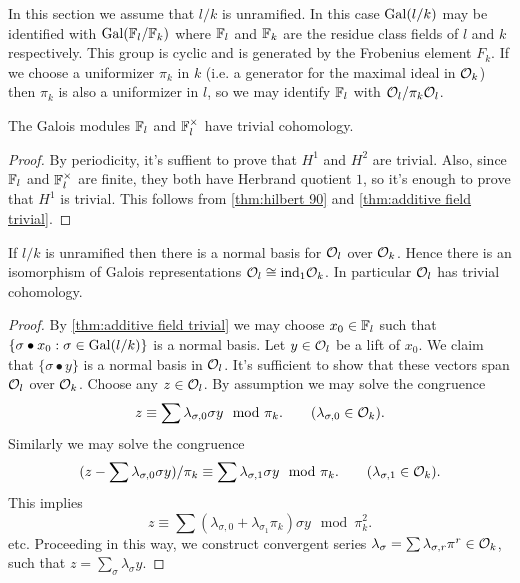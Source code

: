 In this section we assume that $l/k$ is unramified.
In this case $\mathrm{Gal}(l/k)$ may be identified with $\mathrm{Gal}({\mathbb F}_l / {\mathbb F}_k)$ where
${\mathbb F}_l$ and ${\mathbb F}_k$ are the residue class fields of $l$ and $k$ respectively.
This group is cyclic and is generated by the Frobenius element $F_k$.
If we choose a uniformizer $\pi_k$ in $k$ (i.e. a generator for the maximal ideal in ${\mathcal O}_k$)
then $\pi_k$ is also a uniformizer in $l$, so we may identify ${\mathbb F}_l$ with ${\mathcal O}_l / \pi_k {\mathcal O}_l$.

\begin{lemma} \label{lem:finite field trivial}
	The Galois modules ${\mathbb F}_l$ and ${\mathbb F}_l^\times$ have trivial cohomology.
\end{lemma}

\begin{proof}
	By periodicity, it's suffient to prove that $H^1$ and $H^2$ are trivial.
	Also, since ${\mathbb F}_l$ and ${\mathbb F}_l^\times$ are finite, they both have Herbrand quotient $1$,
	so it's enough to prove that $H^1$ is trivial.
	This follows from \ref{thm:hilbert 90} and \ref{thm:additive field trivial}.
\end{proof}


\begin{lemma} \label{lem:unramified additive trivial}
	If $l/k$ is unramified then there is a normal basis for ${\mathcal O}_l$ over ${\mathcal O}_k$.
	Hence there is an isomorphism of Galois representations ${\mathcal O}_l \cong \mathrm{ind}_1 {\mathcal O}_k$.
	In particular ${\mathcal O}_l$ has trivial cohomology.
\end{lemma}

\begin{proof}
	By \ref{thm:additive field trivial}
	we may choose $x_0 \in {\mathbb F}_l$
	such that $\{\sigma \bullet x_0 :\sigma \in \mathrm{Gal}(l/k)\}$ is a normal basis.
	Let $y \in {\mathcal O}_l$ be a lift of $x_0$.
	We claim that $\{\sigma \bullet y\}$ is a normal basis
	in ${\mathcal O}_l$. It's sufficient to show that these vectors span ${\mathcal O}_l$ over ${\mathcal O}_k$.
	Choose any $z \in {\mathcal O}_l$. By assumption we may solve the congruence
	\[
		z \equiv \sum \lambda_{\sigma,0} \sigma y \mod \pi_k.
		\qquad
		(\lambda_{\sigma,0} \in {\mathcal O}_k).
	\]
	Similarly we may solve the congruence
	\[
		(z - \sum \lambda_{\sigma,0} \sigma y) / \pi_k \equiv \sum \lambda_{\sigma,1} \sigma y \mod \pi_k.
		\qquad
		(\lambda_{\sigma,1} \in {\mathcal O}_k).
	\]
	This implies
	\[
		z \equiv \sum (\lambda_{\sigma,0} + \lambda_{\sigma_1} \pi_k) \sigma y \mod \pi_k^2.
	\]
	etc.
	Proceeding in this way, we construct convergent series
	$\lambda_{\sigma} = \sum \lambda_{\sigma,r}\pi^r \in {\mathcal O}_k$,
	such that $z = \sum_\sigma \lambda_\sigma y$.
\end{proof}




